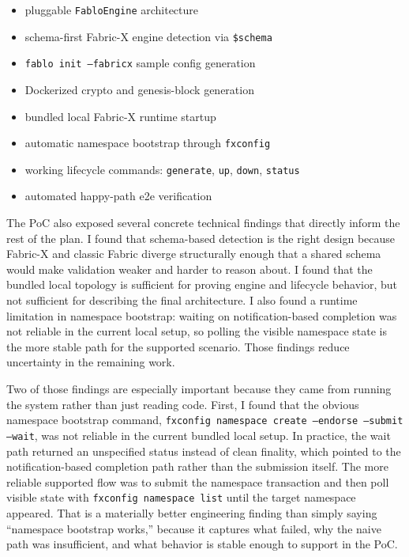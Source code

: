 \begin{tcolorbox}[colback=gray!5!white, colframe=gray!50!black,
  title=PoC deliverables already implemented,
  fonttitle=\bfseries, arc=4pt]
\begin{itemize}[leftmargin=*]
  \item pluggable \texttt{FabloEngine} architecture
  \item schema-first Fabric-X engine detection via \texttt{\$schema}
  \item \texttt{fablo init --fabricx} sample config generation
  \item Dockerized crypto and genesis-block generation
  \item bundled local Fabric-X runtime startup
  \item automatic namespace bootstrap through \texttt{fxconfig}
  \item working lifecycle commands: \texttt{generate}, \texttt{up}, \texttt{down}, \texttt{status}
  \item automated happy-path e2e verification
\end{itemize}
\end{tcolorbox}

The PoC also exposed several concrete technical findings that directly inform the rest of the plan. I found that schema-based detection is the right design because Fabric-X and classic Fabric diverge structurally enough that a shared schema would make validation weaker and harder to reason about. I found that the bundled local topology is sufficient for proving engine and lifecycle behavior, but not sufficient for describing the final architecture. I also found a runtime limitation in namespace bootstrap: waiting on notification-based completion was not reliable in the current local setup, so polling the visible namespace state is the more stable path for the supported scenario. Those findings reduce uncertainty in the remaining work.

Two of those findings are especially important because they came from running the system rather than just reading code. First, I found that the obvious namespace bootstrap command,
\texttt{fxconfig namespace create --endorse --submit --wait}, was not reliable in the current bundled local setup. In practice, the wait path returned an unspecified status instead of clean finality, which pointed to the notification-based completion path rather than the submission itself. The more reliable supported flow was to submit the namespace transaction and then poll visible state with \texttt{fxconfig namespace list} until the target namespace appeared. That is a materially better engineering finding than simply saying ``namespace bootstrap works,'' because it captures what failed, why the naive path was insufficient, and what behavior is stable enough to support in the PoC.

